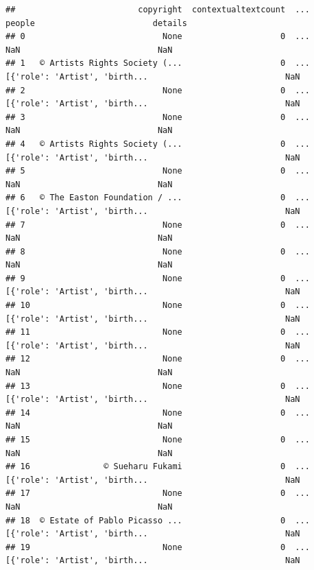 \documentclass[
]{book}
\begin{document}
\begin{verbatim}
##                         copyright  contextualtextcount  ...                         people                        details
## 0                            None                    0  ...                            NaN                            NaN
## 1   © Artists Rights Society (...                    0  ...  [{'role': 'Artist', 'birth...                            NaN
## 2                            None                    0  ...  [{'role': 'Artist', 'birth...                            NaN
## 3                            None                    0  ...                            NaN                            NaN
## 4   © Artists Rights Society (...                    0  ...  [{'role': 'Artist', 'birth...                            NaN
## 5                            None                    0  ...                            NaN                            NaN
## 6   © The Easton Foundation / ...                    0  ...  [{'role': 'Artist', 'birth...                            NaN
## 7                            None                    0  ...                            NaN                            NaN
## 8                            None                    0  ...                            NaN                            NaN
## 9                            None                    0  ...  [{'role': 'Artist', 'birth...                            NaN
## 10                           None                    0  ...  [{'role': 'Artist', 'birth...                            NaN
## 11                           None                    0  ...  [{'role': 'Artist', 'birth...                            NaN
## 12                           None                    0  ...                            NaN                            NaN
## 13                           None                    0  ...  [{'role': 'Artist', 'birth...                            NaN
## 14                           None                    0  ...                            NaN                            NaN
## 15                           None                    0  ...                            NaN                            NaN
## 16               © Sueharu Fukami                    0  ...  [{'role': 'Artist', 'birth...                            NaN
## 17                           None                    0  ...                            NaN                            NaN
## 18  © Estate of Pablo Picasso ...                    0  ...  [{'role': 'Artist', 'birth...                            NaN
## 19                           None                    0  ...  [{'role': 'Artist', 'birth...                            NaN

\end{verbatim}
\end{document}
